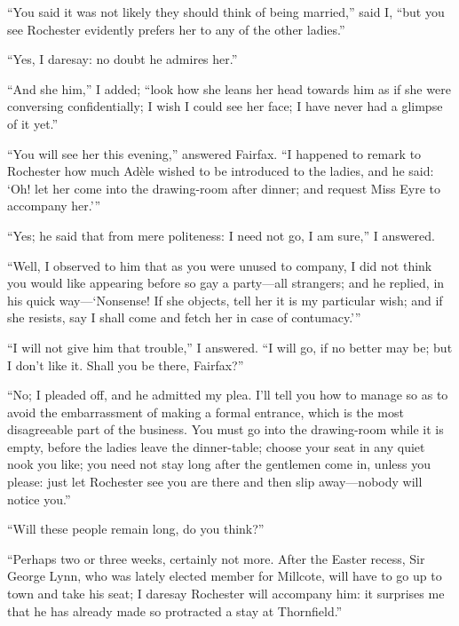 \enquote{You said it was not likely they should think of being married,}
said I, \enquote{but you see \Mr{} Rochester evidently prefers her to any
of the other ladies.}

\enquote{Yes, I daresay: no doubt he admires her.}

\enquote{And she him,} I added; \enquote{look how she leans her head
towards him as if she were conversing confidentially; I wish I could see
her face; I have never had a glimpse of it yet.}

\enquote{You will see her this evening,} answered \Mrs{} Fairfax. 
\enquote{I happened to remark to \Mr{} Rochester how much Adèle wished to
be introduced to the ladies, and he said: \enquote{Oh! let her come
into the drawing-room after dinner; and request Miss Eyre to accompany
her.}}

\enquote{Yes; he said that from mere politeness: I need not go, I am
sure,} I answered.

\enquote{Well, I observed to him that as you were unused to company, I
did not think you would like appearing before so gay a party---all
strangers; and he replied, in his quick way---\enquote{Nonsense! If she
objects, tell her it is my particular wish; and if she resists, say I
shall come and fetch her in case of contumacy.}}

\enquote{I will not give him that trouble,} I answered. \enquote{I will
go, if no better may be; but I don't like it. Shall you be there, \Mrs{}
Fairfax?}

\enquote{No; I pleaded off, and he admitted my plea. I'll tell you how
to manage so as to avoid the embarrassment of making a formal entrance,
which is the most disagreeable part of the business. You must go into
the drawing-room while it is empty, before the ladies leave the
dinner-table; choose your seat in any quiet nook you like; you need not
stay long after the gentlemen come in, unless you please: just let \Mr{}
 Rochester see you are there and then slip away---nobody will notice
you.}

\enquote{Will these people remain long, do you think?}

\enquote{Perhaps two or three weeks, certainly not more. After the
Easter recess, Sir George Lynn, who was lately elected member for
Millcote, will have to go up to town and take his seat; I daresay \Mr{}
 Rochester will accompany him: it surprises me that he has already made
so protracted a stay at Thornfield.}

